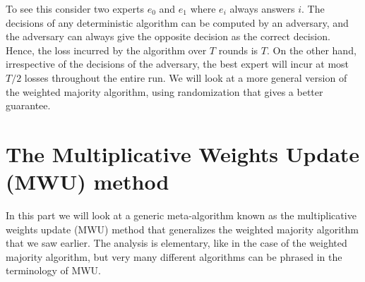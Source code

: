 To see this consider two experts $e_0$ and $e_1$ where $e_i$ always answers
$i$. The decisions of any deterministic algorithm can be computed by an
adversary, and the adversary can always give the opposite decision as the
correct decision. Hence, the loss incurred by the algorithm over $T$ rounds is
$T$. On the other hand, irrespective of the decisions of the adversary, the best
expert will incur at most $T/2$ losses throughout the entire run. We will look
at a more general version of the weighted majority algorithm, using
randomization that gives a better guarantee.
      

\section{The Multiplicative Weights Update (MWU) method}

In this part we will look at a generic meta-algorithm known as the
multiplicative weights update (MWU) method that generalizes the weighted
majority algorithm that we saw earlier. The analysis is elementary, like in the
case of the weighted majority algorithm, but very many different algorithms can
be phrased in the terminology of MWU.


